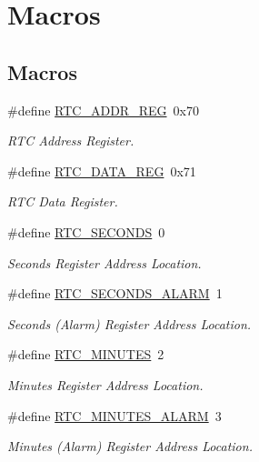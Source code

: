 \hypertarget{group__RTC}{}\section{Macros}
\label{group__RTC}
\subsection*{Macros}
\begin{DoxyCompactItemize}
\item 
\#define \hyperlink{group__RTC_ga710b98232df2c563009e6f8a6cd18220}{R\+T\+C\+\_\+\+A\+D\+D\+R\+\_\+\+R\+EG}~0x70
\begin{DoxyCompactList}\small\item\em R\+TC Address Register. \end{DoxyCompactList}\item 
\#define \hyperlink{group__RTC_ga2f258a00c59c3f347c8d2d4a75471ce0}{R\+T\+C\+\_\+\+D\+A\+T\+A\+\_\+\+R\+EG}~0x71
\begin{DoxyCompactList}\small\item\em R\+TC Data Register. \end{DoxyCompactList}\item 
\#define \hyperlink{group__RTC_ga43f6540c6d3a78b930f9adad56cf7fac}{R\+T\+C\+\_\+\+S\+E\+C\+O\+N\+DS}~0
\begin{DoxyCompactList}\small\item\em Seconds Register Address Location. \end{DoxyCompactList}\item 
\#define \hyperlink{group__RTC_gaba1a00fd8dcaa066bbb9cecacb4dd04b}{R\+T\+C\+\_\+\+S\+E\+C\+O\+N\+D\+S\+\_\+\+A\+L\+A\+RM}~1
\begin{DoxyCompactList}\small\item\em Seconds (Alarm) Register Address Location. \end{DoxyCompactList}\item 
\#define \hyperlink{group__RTC_gaabc0725ac27ea93c913a2a4d7cd51ac7}{R\+T\+C\+\_\+\+M\+I\+N\+U\+T\+ES}~2
\begin{DoxyCompactList}\small\item\em Minutes Register Address Location. \end{DoxyCompactList}\item 
\#define \hyperlink{group__RTC_ga3354ceb0b3dc74b2ff1123ecd0b7c043}{R\+T\+C\+\_\+\+M\+I\+N\+U\+T\+E\+S\+\_\+\+A\+L\+A\+RM}~3
\begin{DoxyCompactList}\small\item\em Minutes (Alarm) Register Address Location. \end{DoxyCompactList}\item 

\end{DoxyCompactItemize}
